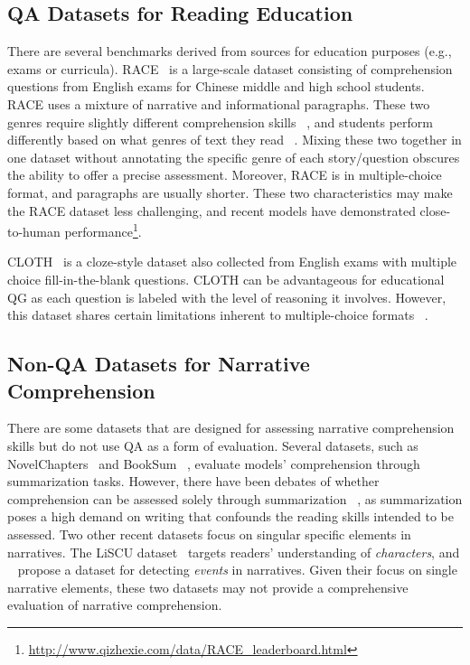 \documentclass[11pt]{article}
\begin{document}
\subsection{QA Datasets for Reading Education}
There are several benchmarks derived from sources for education purposes (e.g., exams or curricula). RACE~\cite{lai2017race} is a large-scale dataset consisting of comprehension questions from English exams for Chinese middle and high school students. RACE uses a mixture of narrative and informational paragraphs. These two genres require slightly different comprehension skills ~\cite{liebfreund2021cognitive}, and students perform differently based on what genres of text they read ~\cite{denton2015text}. Mixing these two together in one dataset without annotating the specific genre of each story/question obscures the ability to offer a precise assessment. Moreover, RACE is in multiple-choice format, and paragraphs are usually shorter. These two characteristics may make the RACE dataset less challenging, and recent models have demonstrated close-to-human performance\footnote{\url{http://www.qizhexie.com/data/RACE_leaderboard.html}}. 


CLOTH~\cite{xie2017large} is a cloze-style dataset also collected from English exams with multiple choice fill-in-the-blank questions. CLOTH can be advantageous for educational QG as each question is labeled with the level of reasoning it involves. However, this dataset shares certain limitations inherent to multiple-choice formats ~\cite{klufa2015multiple}. 


\subsection{Non-QA Datasets for Narrative Comprehension}
There are some datasets that are designed for assessing narrative comprehension skills but do not use QA as a form of evaluation. Several datasets, such as NovelChapters~\cite{ladhak2020exploring} and BookSum ~\cite{kryscinski2021booksum}, evaluate models' comprehension through summarization tasks. However, there have been debates of whether comprehension can be assessed solely through summarization ~\cite{head1989examination}, as summarization poses a high demand on writing that confounds the reading skills intended to be assessed.  
Two other recent datasets focus on singular specific elements in narratives. The LiSCU dataset~\cite{brahman2021let} targets readers' understanding of \textit{characters}, and ~\citet{sims2019literary} propose a dataset for detecting \textit{events} in narratives. Given their focus on single narrative elements, these two datasets may not provide a comprehensive evaluation of narrative comprehension.
\end{document}
